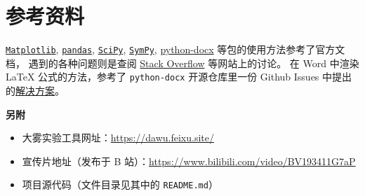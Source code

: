 \section{参考资料}

\href{https://matplotlib.org/stable/index.html}{\texttt{Matplotlib}}, \href{https://pandas.pydata.org/docs/}{\texttt{pandas}}, \href{https://docs.scipy.org/doc/scipy/}{\texttt{SciPy}}, \href{https://docs.sympy.org/latest/index.html}{\texttt{SymPy}}, \href{https://python-docx.readthedocs.io/en/latest/}{python-docx} 等包的使用方法参考了官方文档，
遇到的各种问题则是查阅 \href{https://stackoverflow.com/}{Stack Overflow} 等网站上的讨论。
在 Word 中渲染 \LaTeX{} 公式的方法，参考了 \verb|python-docx| 开源仓库里一份 Github Issues 中提出的\href{https://github.com/python-openxml/python-docx/issues/320#issuecomment-798749198}{解决方案}。

\vskip 0.05in
{\noindent\large\bfseries 另附}
\begin{itemize}[nosep]
  \item 大雾实验工具网址：\url{https://dawu.feixu.site/}
  \item 宣传片地址（发布于 B 站）：\url{https://www.bilibili.com/video/BV193411G7aP}
  \item 项目源代码（文件目录见其中的 \verb|README.md|）
\end{itemize}